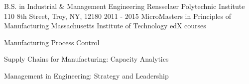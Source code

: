 

\begin{cventries}

  \cventry
    {B.S. in Industrial \& Management Engineering} %
    {Rensselaer Polytechnic Institute} %
    {110 8th Street, Troy, NY, 12180} %
    {2011 - 2015} %
    {
    }
    \vspace{-0.25cm}
  \cventry
    {MicroMasters in Principles of Manufacturing} %
    {Massachusetts Institute of Technology edX courses} %
    {} %
    {} %
    {
      \begin{cvitems} %
            \item {Manufacturing Process Control}
            \item {Supply Chains for Manufacturing: Capacity Analytics}
            \item {Management in Engineering: Strategy and Leadership}
      \end{cvitems}
    }
\end{cventries}
